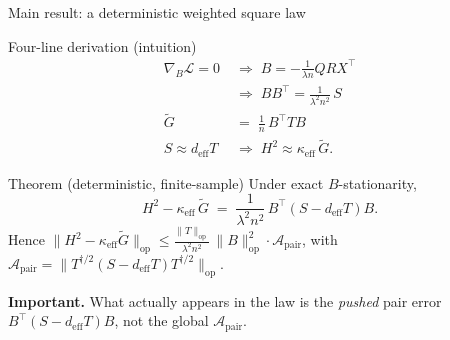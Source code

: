 \documentclass[10pt,aspectratio=169]{beamer}
\newcommand{\hl}[1]{{\color{nicered}\textbf{#1}}}
\newcommand{\T}{^{\!\top}}
\newcommand{\Gw}{\widetilde{G}}
\newcommand{\op}{\mathrm{op}}
\begin{document}
\begin{frame}{Main result: a deterministic weighted square law}
  \footnotesize
  \begin{ibox}{Four-line derivation (intuition)}
    \vspace{-6pt}
    \begin{align*}
      \nabla_B \mathcal{L} = 0 \;&\Rightarrow\; B = -\tfrac{1}{\lambda n} QRX\T \\
      \;&\Rightarrow\; BB\T = \tfrac{1}{\lambda^2 n^2}\, S \\
      \Gw \;&=\; \tfrac{1}{n}\, B\T T B \\
      S \approx d_{\mathrm{eff}} T \;&\Rightarrow\; H^2 \approx \kappa_{\mathrm{eff}}\, \Gw.
    \end{align*}
  \end{ibox}
  \vspace{2pt}
  \begin{ibox}{Theorem (deterministic, finite-sample)}
    Under exact $B$-stationarity,
    \[
      H^2 - \kappa_{\mathrm{eff}}\, \Gw \;=\; \frac{1}{\lambda^2 n^2}\, B\T (S - d_{\mathrm{eff}} T) B.
    \]
    Hence $\|H^2 - \kappa_{\mathrm{eff}}\Gw\|_\op \le \tfrac{\|T\|_\op}{\lambda^2 n^2}\,\|B\|_\op^2 \cdot \mathcal{A}_{\mathrm{pair}}$, with $\mathcal{A}_{\mathrm{pair}} = \|T^{\dagger/2}(S - d_{\mathrm{eff}} T) T^{\dagger/2}\|_\op$.
  \end{ibox}
  \vspace{4pt}
  \hl{Important.} What actually appears in the law is the \emph{pushed} pair error $B\T (S - d_{\mathrm{eff}} T) B$, not the global $\mathcal{A}_{\mathrm{pair}}$.
\end{frame}
\end{document}
